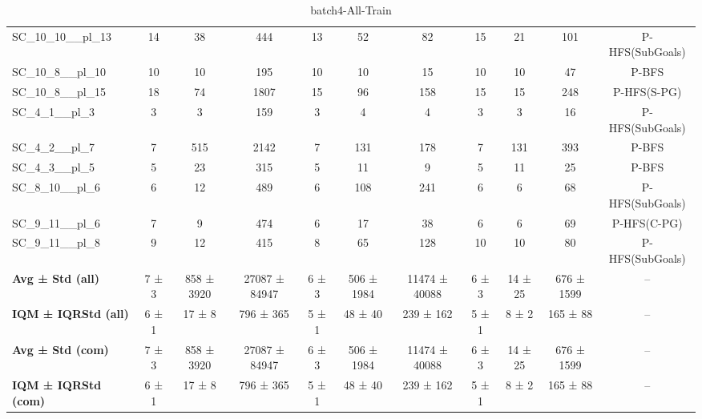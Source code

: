 \begin{table}[!ht]
\begin{tabular}{l|ccc|ccc|cccc}
SC\_10\_10\_\_pl\_13 & 14 & 38 & 444 & 13 & 52 & 82 & 15 & 21 & 101 & P-HFS(SubGoals) \\
SC\_10\_8\_\_pl\_10 & 10 & 10 & 195 & 10 & 10 & 15 & 10 & 10 & 47 & P-BFS \\
SC\_10\_8\_\_pl\_15 & 18 & 74 & 1807 & 15 & 96 & 158 & 15 & 15 & 248 & P-HFS(S-PG) \\
SC\_4\_1\_\_pl\_3 & 3 & 3 & 159 & 3 & 4 & 4 & 3 & 3 & 16 & P-HFS(SubGoals) \\
SC\_4\_2\_\_pl\_7 & 7 & 515 & 2142 & 7 & 131 & 178 & 7 & 131 & 393 & P-BFS \\
SC\_4\_3\_\_pl\_5 & 5 & 23 & 315 & 5 & 11 & 9 & 5 & 11 & 25 & P-BFS \\
SC\_8\_10\_\_pl\_6 & 6 & 12 & 489 & 6 & 108 & 241 & 6 & 6 & 68 & P-HFS(SubGoals) \\
SC\_9\_11\_\_pl\_6 & 7 & 9 & 474 & 6 & 17 & 38 & 6 & 6 & 69 & P-HFS(C-PG) \\
SC\_9\_11\_\_pl\_8 & 9 & 12 & 415 & 8 & 65 & 128 & 10 & 10 & 80 & P-HFS(SubGoals) \\
\hline
\textbf{Avg ± Std (all)} & 7 ± 3 & 858 ± 3920 & 27087 ± 84947 & 6 ± 3 & 506 ± 1984 & 11474 ± 40088 & 6 ± 3 & 14 ± 25 & 676 ± 1599 & -- \\
\textbf{IQM ± IQRStd (all)} & 6 ± 1 & 17 ± 8 & 796 ± 365 & 5 ± 1 & 48 ± 40 & 239 ± 162 & 5 ± 1 & 8 ± 2 & 165 ± 88 & -- \\
\textbf{Avg ± Std (com)} & 7 ± 3 & 858 ± 3920 & 27087 ± 84947 & 6 ± 3 & 506 ± 1984 & 11474 ± 40088 & 6 ± 3 & 14 ± 25 & 676 ± 1599 & -- \\
\textbf{IQM ± IQRStd (com)} & 6 ± 1 & 17 ± 8 & 796 ± 365 & 5 ± 1 & 48 ± 40 & 239 ± 162 & 5 ± 1 & 8 ± 2 & 165 ± 88 & -- \\
\end{tabular}
\caption{batch4-All-Train}
\label{tab:batch4_All_comparison_train}
\end{table}

